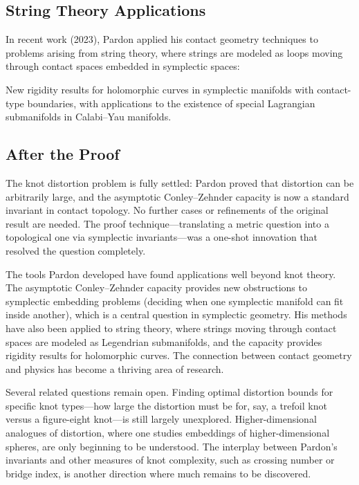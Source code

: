 \subsection{String Theory Applications}

In recent work (2023), Pardon applied his contact geometry techniques to problems arising from string theory, where strings are modeled as loops moving through contact spaces embedded in symplectic spaces:

\begin{theorem}
New rigidity results for holomorphic curves in symplectic manifolds with contact-type boundaries, with applications to the existence of special Lagrangian submanifolds in Calabi--Yau manifolds.
\end{theorem}

\subsection{After the Proof}

The knot distortion problem is fully settled: Pardon proved that distortion can be arbitrarily large, and the asymptotic Conley--Zehnder capacity is now a standard invariant in contact topology. No further cases or refinements of the original result are needed. The proof technique---translating a metric question into a topological one via symplectic invariants---was a one-shot innovation that resolved the question completely.

The tools Pardon developed have found applications well beyond knot theory. The asymptotic Conley--Zehnder capacity provides new obstructions to symplectic embedding problems (deciding when one symplectic manifold can fit inside another), which is a central question in symplectic geometry. His methods have also been applied to string theory, where strings moving through contact spaces are modeled as Legendrian submanifolds, and the capacity provides rigidity results for holomorphic curves. The connection between contact geometry and physics has become a thriving area of research.

Several related questions remain open. Finding optimal distortion bounds for specific knot types---how large the distortion must be for, say, a trefoil knot versus a figure-eight knot---is still largely unexplored. Higher-dimensional analogues of distortion, where one studies embeddings of higher-dimensional spheres, are only beginning to be understood. The interplay between Pardon's invariants and other measures of knot complexity, such as crossing number or bridge index, is another direction where much remains to be discovered.

